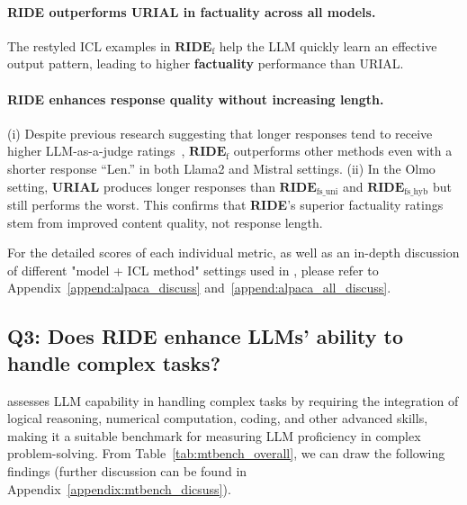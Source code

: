 \paragraph{\textbf{RIDE} outperforms \textbf{URIAL} in factuality across all models.} The restyled ICL examples in $\textbf{RIDE}_{\text{f}}$ help the LLM quickly learn an effective output pattern, leading to higher \textbf{\color{myblue} factuality} performance than URIAL.

\paragraph{\textbf{RIDE} enhances response quality without increasing length.} (i) Despite previous research suggesting that longer responses tend to receive higher LLM-as-a-judge ratings~\citep{DBLP:journals/corr/abs-2404-04475}, $\textbf{RIDE}_{\text{f}}$ outperforms other methods even with a shorter response ``Len.'' in both Llama2 and Mistral settings.
(ii) In the Olmo setting, \textbf{URIAL} produces longer responses than $\textbf{RIDE}_{\text{fs\_uni}}$ and $\textbf{RIDE}_{\text{fs\_hyb}}$ but still performs the worst. This confirms that \textbf{RIDE}'s superior factuality ratings stem from improved content quality, not response length.

For the detailed scores of each individual metric, as well as an in-depth discussion of different "model + ICL method" settings used in \alpaca{}, please refer to Appendix~\ref{append:alpaca_discuss} and~\ref{append:alpaca_all_discuss}.

\subsection{Q3: Does \textbf{RIDE} enhance LLMs' ability to handle complex tasks?}
\label{ssec:exp_mtbench}



\mtbench{} assesses LLM capability in handling complex tasks by requiring the integration of logical reasoning, numerical computation, coding, and other advanced skills, making it a suitable benchmark for measuring LLM proficiency in complex problem-solving.
From Table~\ref{tab:mtbench_overall}, we can draw the following findings (further discussion can be found in Appendix~\ref{appendix:mtbench_dicsuss}).


